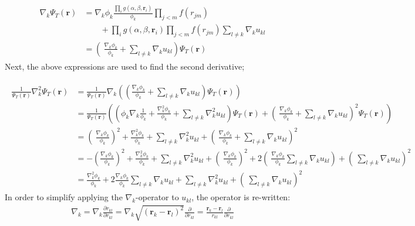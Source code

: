 \documentclass[%
oneside,                 %
final,                   %
10pt]{article}
\begin{document}
\begin{appendices}
\begin{align}
\begin{split}
  \nabla_k\Psi_T(\mathbf{r}) &=\nabla_k \phi_k \frac{\prod_i g(\alpha,\beta,\mathbf{r}_i)}{\phi_k}\prod_{j<m} f(r_{jm})
  \\
  &\qquad
  +  \prod_i  g(\alpha,\beta,\mathbf{r}_i)
 \prod_{j<m} f(r_{jm})\sum_{l\ne k}\nabla_k u_{kl} \\
&= \left(\ \frac{\nabla_k \phi_k}{\phi_k} + \sum_{l\ne k}\nabla_k u_{kl} \right) \Psi_T(\mathbf{r})  
\end{split}
\label{eq:A1_gradpsi}
\end{align}
Next, the above expressions are used to find the second derivative;

\begin{align}  
\begin{split}
\frac{1}{\Psi_T(\mathbf{r})} \nabla_k^2\Psi_T(\mathbf{r}) 
&=
\frac{1}{\Psi_T(\mathbf{r})} \nabla_k\left( \left(\frac{\nabla_k \phi_k}{\phi_k} + \sum_{l\ne k}\nabla_k u_{kl} \right) \Psi_T(\mathbf{r}) \right)\\
&=
\frac{1}{\Psi_T(\mathbf{r})} \left(\left(\phi_k \nabla_k\frac{1}{\phi_k} +\frac{\nabla_k^2 \phi_k}{\phi_k} + \sum_{l\ne k}\nabla_k^2 u_{kl} \right)\Psi_T(\mathbf{r}) + 
\left(\ \frac{\nabla_k \phi_k}{\phi_k} + \sum_{l\ne k}\nabla_k u_{kl} \right)^2 \Psi_T(\mathbf{r})   \right) \\
&=
 \left(\ \frac{\nabla_k \phi_k}{\phi_k} \right)^2 + \frac{\nabla_k^2 \phi_k}{\phi_k} + \sum_{l\ne k}\nabla_k^2 u_{kl}  + 
\left(\ \frac{\nabla_k \phi_k}{\phi_k} + \sum_{l\ne k}\nabla_k u_{kl} \right)^2 \\
&=
 -\left(\frac{\nabla_k \phi_k}{\phi_k}\right)^2 + \frac{\nabla_k^2 \phi_k}{\phi_k} + \sum_{l\ne k}\nabla_k^2 u_{kl}  + 
\left(\ \frac{\nabla_k \phi_k}{\phi_k} \right)^2 + 2\left(\ \frac{\nabla_k \phi_k}{\phi_k} \sum_{l\ne k}\nabla_k u_{kl} \right)+ \left(\ \sum_{l\ne k}\nabla_k u_{kl} \right)^2 \\
&= 
\frac{\nabla_k^2 \phi_k}{\phi_k} + 2  \frac{\nabla_k \phi_k}{\phi_k} \sum_{l\ne k}\nabla_k u_{kl} + \sum_{l\ne k}\nabla_k^2 u_{kl}   + \left(\ \sum_{l\ne k}\nabla_k u_{kl} \right)^2
\end{split}      
\end{align}
In order to simplify applying the $\nabla_k$-operator to $u_{kl}$, the operator is re-written:
\begin{align*}
\nabla_k = \nabla_k \frac{\partial r_{kl}}{\partial r_{kl}} = \nabla_k \sqrt{\left(\bm r_k - \bm r_l \right)^2} \frac{\partial}{\partial r_{kl}} = \frac{\bm r_k - \bm r_l}{r_{kl}} \frac{\partial}{\partial r_{kl}}

\end{align*}
\end{appendices}
\end{document}
